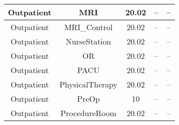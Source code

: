 \begin{table}
\begin{tabular}{|c|c|c|c|c|}
Outpatient             & MRI                     & 20.02                                                                                                         & --                                & --                                                                                                             \\ \hline
Outpatient             & MRI\_Control            & 20.02                                                                                                         & --                                & --                                                                                                             \\ \hline
Outpatient             & NurseStation            & 20.02                                                                                                         & --                                & --                                                                                                             \\ \hline
Outpatient             & OR                      & 20.02                                                                                                         & --                                & --                                                                                                             \\ \hline
Outpatient             & PACU                    & 20.02                                                                                                         & --                                & --                                                                                                             \\ \hline
Outpatient             & PhysicalTherapy         & 20.02                                                                                                         & --                                & --                                                                                                             \\ \hline
Outpatient             & PreOp                   & 10                                                                                                            & --                                & --                                                                                                             \\ \hline
Outpatient             & ProcedureRoom           & 20.02                                                                                                         & --                                & --                                                                                                             \\ \hline

\end{tabular}
\end{table}
